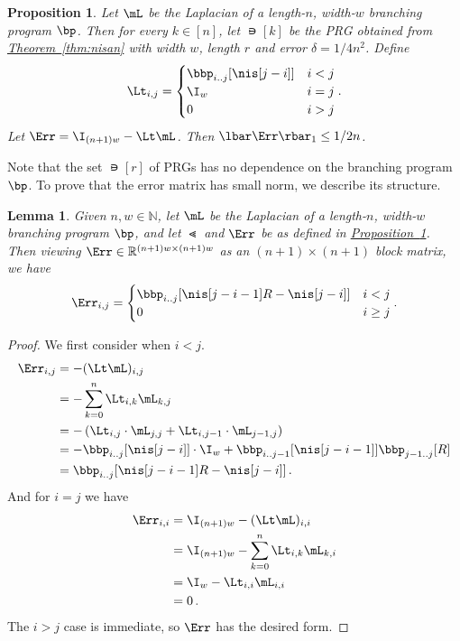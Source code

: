 \documentclass[11pt]{article}
\newcommand{\expref}[2]{\texorpdfstring{\hyperref[#2]{#1~\ref{#2}}}{#1~\ref{#2}}}
\newtheorem{lemma}[theorem]{Lemma}
\newtheorem{proposition}[theorem]{Proposition}
\newcommand{\R}{{\mathbb R}}
\newcommand{\N}{{\mathbb N}}
\begin{document}
\begin{proposition}\label{prop:pathErrSmall}
Let $\mL$ be the Laplacian of a length-$n$, width-$w$ branching program $\bp$. Then for every $k\in[n]$, let $\nis[k]$ be the PRG obtained from \expref{Theorem}{thm:nisan} with width $w$, length $r$ and error $\delta=1/4n^2$. Define
\[\Lt_{i,j}=\begin{cases}
\bbp_{i..j}[\nis[j-i]] & i<j\\
\I_w & i=j\\
0 & i>j
\end{cases}.\] 
Let $\Err=\I_{(n+1)w}-\Lt \mL$. Then $\lbar\Err\rbar_1\leq 1/2n$. %
\end{proposition}
%
Note that the set $\nis[r]$ of PRGs has %
no dependence on the branching program $\bp$. To prove
that  %
the error matrix has small norm, we describe its structure.
\begin{lemma}\label{lem:pathErrStruct}
Given $n,w\in \N$, let $\mL$ be the Laplacian of a length-$n$, width-$w$ branching program $\bp$, and let $\Lt$ and $\Err$ be as defined in \expref{Proposition}{prop:pathErrSmall}. Then viewing $\Err\in \R^{(n+1)w\times(n+1)w}$ as an $(n+1)\times(n+1)$ block matrix, 
we have %
\[\Err_{i,j} = \begin{cases}
\bbp_{i..j}[\nis[j-i-1]R-\nis[j-i]] & i<j\\
0 & i\geq j
\end{cases}.\]
\end{lemma}
\begin{proof}
We first consider when $i<j$. %
\begin{align*}
    \Err_{i,j} &= -(\Lt \mL)_{i,j}\\
    &= -\sum_{k=0}^{n}\Lt_{i,k}\mL_{k,j}\\
    &= -\left(\Lt_{i,j}\cdot \mL_{j,j}+\Lt_{i,j-1}\cdot \mL_{j-1,j}\right)\\
    &= -\bbp_{i..j}[\nis[j-i]]\cdot \I_w+\bbp_{i..j-1}[\nis[j-i-1]]\bbp_{j-1..j}[R]\\
    &= \bbp_{i..j}[\nis[j-i-1]R-\nis[j-i]]\,.
\end{align*}
%
And for $i=j$ we have  %
\begin{align*}
    \Err_{i,i} &= \I_{(n+1)w}-(\Lt \mL)_{i,i}\\
    &= \I_{(n+1)w} - \sum_{k=0}^{n}\Lt_{i,k}\mL_{k,i}\\
    &= \I_w - \Lt_{i,i}\mL_{i,i}\\
    &= 0\,.  %
\end{align*}
The $i>j$ case is immediate, so $\Err$ has the desired form.
\end{proof}
\end{document}
